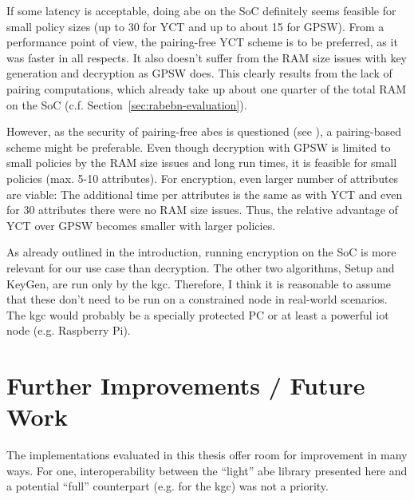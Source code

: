 If some latency is acceptable, doing \acrshort{abe} on the SoC definitely seems feasible for small policy sizes (up to 30 for YCT and up to about 15 for GPSW).
From a performance point of view, the pairing-free YCT scheme is to be preferred, as it was faster in all respects.
It also doesn't suffer from the RAM size issues with key generation and decryption as GPSW does.
This clearly results from the lack of pairing computations, which already take up about one quarter of the total RAM on the SoC (c.f. Section~\ref{sec:rabebn-evaluation}).

However, as the security of pairing-free \acrshort{abes} is questioned (see \cite{herranz_attacking_2020}), a pairing-based scheme might be preferable.
Even though decryption with GPSW is limited to small policies by the RAM size issues and long run times, it is feasible for small policies (max. 5-10 attributes).
For encryption, even larger number of attributes are viable: The additional time per attributes is the same as with YCT and even for 30 attributes there were no RAM size issues.
Thus, the relative advantage of YCT over GPSW becomes smaller with larger policies.

As already outlined in the introduction, running encryption on the SoC is more relevant for our use case than decryption. 
The other two algorithms, Setup and KeyGen, are run only by the \acrshort{kgc}.
Therefore, I think it is reasonable to assume that these don't need to be run on a constrained node in real-world scenarios.
The \acrshort{kgc} would probably be a specially protected PC or at least a powerful \acrshort{iot} node (e.g. Raspberry Pi).

\section{Further Improvements / Future Work}

The implementations evaluated in this thesis offer room for improvement in many ways.
For one, interoperability between the ``light'' \acrshort{abe} library presented here and a potential ``full'' counterpart (e.g. for the \acrshort{kgc}) was not a priority.

